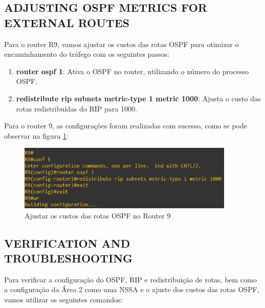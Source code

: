 \documentclass[11pt,english, openright, oneside]{book}
\begin{document}
\subsection{ADJUSTING OSPF METRICS FOR EXTERNAL ROUTES}
\vspace{0.2cm}

Para o router R9, vamos ajustar os custos das rotas OSPF para otimizar o encaminhamento do tráfego com os seguintes passos:
\vspace{0.2cm}

\begin{enumerate}
  \item \textbf{router ospf 1}: Ativa o OSPF no router, utilizando o número do processo OSPF.
  \item \textbf{redistribute rip subnets metric-type 1 metric 1000}: Ajusta o custo das rotas redistribuídas do RIP para 1000.
\end{enumerate}
\vspace{0.2cm}

Para o router 9, as configurações foram realizadas com sucesso, como se pode observar na figura \ref{fig:config34}:
\vspace{0.2cm}

\begin{figure}[H]
  \centering
  \includegraphics[width=0.92\textwidth]{imagens/Tarefa4/21.adjust_R9.png}
  \caption{Ajustar os custos das rotas OSPF no Router 9}
  \label{fig:config34}
\end{figure}
\vspace{0.2cm}

\subsection{VERIFICATION AND TROUBLESHOOTING}
\vspace{0.2cm}

Para verificar a configuração do OSPF, RIP e redistribuição de rotas, bem como a configuração da Área 2 como uma NSSA e o ajuste dos custos das rotas OSPF, vamos utilizar os seguintes comandos:
\vspace{0.2cm}
\end{document}
